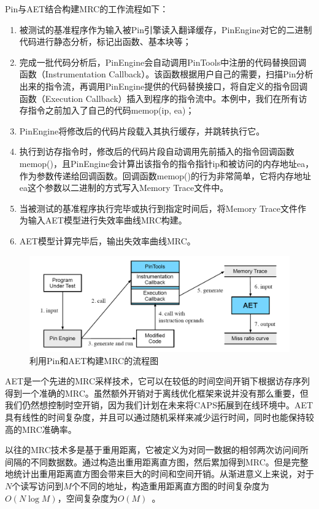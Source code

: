 Pin与AET结合构建MRC的工作流程如下：
\begin{enumerate}
\item 被测试的基准程序作为输入被Pin引擎读入翻译缓存，PinEngine对它的二进制代码进行静态分析，标记出函数、基本块等；
\item 完成一批代码分析后，PinEngine会自动调用PinTools中注册的代码替换回调函数（Instrumentation Callback）。该函数根据用户自己的需要，扫描Pin分析出来的指令流，再调用PinEngine提供的代码替换接口，将自定义的指令回调函数（Execution Callback）插入到程序的指令流中。本例中，我们在所有访存指令之前加入了自己的代码memop(ip, ea)；
\item PinEngine将修改后的代码片段载入其执行缓存，并跳转执行它。
\item 执行到访存指令时，修改后的代码片段自动调用先前插入的指令回调函数memop()，且PinEngine会计算出该指令的指令指针ip和被访问的内存地址ea，作为参数传递给回调函数。回调函数memop()的行为非常简单，它将内存地址ea这个参数以二进制的方式写入Memory Trace文件中。
\item 当被测试的基准程序执行完毕或执行到指定时间后，将Memory Trace文件作为输入AET模型进行失效率曲线MRC构建。
\item AET模型计算完毕后，输出失效率曲线MRC。
\end{enumerate}

\begin{figure}[htbp] 
    \centering
    \includegraphics[width=0.8\linewidth]{figures/pin.png}
    \caption{利用Pin和AET构建MRC的流程图}
    \label{fig:pin}
\end{figure}

AET是一个先进的MRC采样技术，它可以在较低的时间空间开销下根据访存序列得到一个准确的MRC。虽然额外开销对于离线优化框架来说并没有那么重要，但我们仍然想控制时空开销，因为我们计划在未来将CAPS拓展到在线环境中。AET具有线性的时间复杂度，并且可以通过随机采样来减少运行时间，同时也能保持较高的MRC准确率。

以往的MRC技术多是基于重用距离，它被定义为对同一数据的相邻两次访问间所间隔的不同数据数。通过构造出重用距离直方图，然后累加得到MRC。但是完整地统计出重用距离直方图会带来巨大的时间和空间开销。从渐进意义上来说，对于$N$个读写访问到$M$个不同的地址，构造重用距离直方图的时间复杂度为$O(N\log M)$，空间复杂度为$O(M)$~\parencite{olken1981efficient}。

